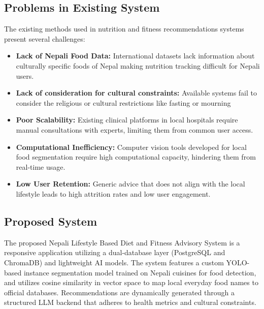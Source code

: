 \documentclass[11pt,a4paper]{article}
\begin{document}
\subsection{Problems in Existing System}
The existing methods used in nutrition and fitness recommendations systems present several challenges:
\begin{itemize}[leftmargin=*]
\item \textbf{Lack of Nepali Food Data:} International datasets lack information about culturally specific foods
of Nepal making nutrition tracking difficult for Nepali users.
\item \textbf{Lack of consideration for cultural constraints:}  Available systems fail to consider the religious
or cultural restrictions like fasting or mourning
\item \textbf{Poor Scalability:}  Existing clinical platforms in local hospitals require manual consultations with
experts, limiting them from common user access.
\item \textbf{Computational Inefficiency:} Computer vision tools developed for local food segmentation require
high computational capacity, hindering them from real-time usage.
\item \textbf{Low User Retention:} Generic advice that does not align with the local lifestyle leads to high attrition rates and low user engagement.
\end{itemize}

\subsection{Proposed System}
The proposed Nepali Lifestyle Based Diet and Fitness Advisory System is a responsive application utilizing a dual-database layer (PostgreSQL and ChromaDB) and lightweight AI models. The system features a custom YOLO-based instance segmentation model trained on Nepali cuisines for food detection, and utilizes cosine similarity in vector space to map local everyday food names to official databases. Recommendations are dynamically generated through a structured LLM backend that adheres to health metrics and cultural constraints.


\end{document}
